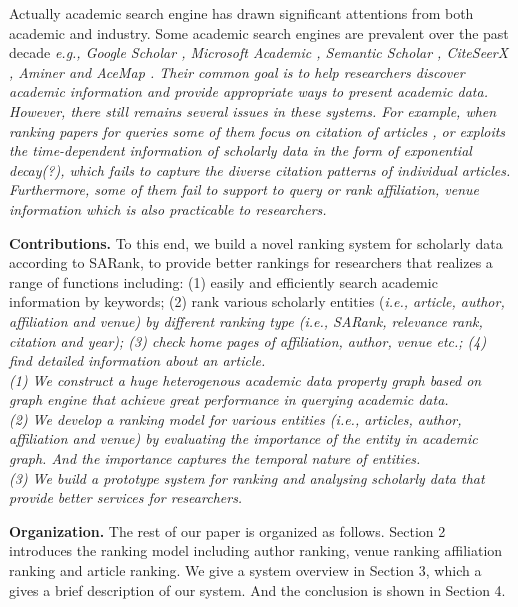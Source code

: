 \par
Actually academic search engine has drawn significant attentions from both academic and industry. Some academic search engines are prevalent over the past decade \itshape e.g., \upshape Google Scholar \cite{googlescholar}, Microsoft Academic \cite{sinha2015overview}, Semantic Scholar \cite{semantic}, CiteSeerX \cite{li2006citeseerx}, Aminer \cite{tang2008arnetminer} and AceMap \cite{tan2016acemap}. Their common goal is to help researchers discover academic information and provide appropriate ways to present academic data. However, there still remains several issues in these systems. For example, when ranking papers for queries some of them focus on citation of articles \cite{tang2008arnetminer,tan2016acemap}, or exploits the time-dependent information of scholarly data in the form of exponential decay(?), which fails to capture the diverse citation patterns of individual articles. Furthermore, some of them fail to support to query or rank affiliation, venue information which is also practicable to researchers.

\par
\textbf{Contributions.}
To this end, we build a novel ranking system for scholarly data according to SARank, to provide better rankings for researchers that realizes a range of functions including: (1) easily and efficiently search academic information by keywords; (2) rank various scholarly entities (\itshape i.e., \upshape article, author, affiliation and venue) by different ranking type (\itshape i.e., \upshape SARank, relevance rank, citation and year); (3) check home pages of affiliation, author, venue  \itshape etc.; \upshape (4) find detailed information about an article.\\
(1) We construct a huge heterogenous academic data property graph based on graph engine that achieve great performance in querying academic data. \\
(2) We develop a ranking model for various entities (\itshape i.e., \upshape articles, author, affiliation and venue) by evaluating the importance of the entity in academic graph. And the importance captures the temporal nature of entities. \\
(3) We build a prototype system for ranking and analysing scholarly data that provide better services for researchers.

\par
\textbf{Organization.}
The rest of our paper is organized as follows. Section 2 introduces the ranking model including author ranking, venue ranking affiliation ranking and article ranking. We give a system overview in Section 3, which a gives a brief description of our system. And the conclusion is shown in Section 4. 